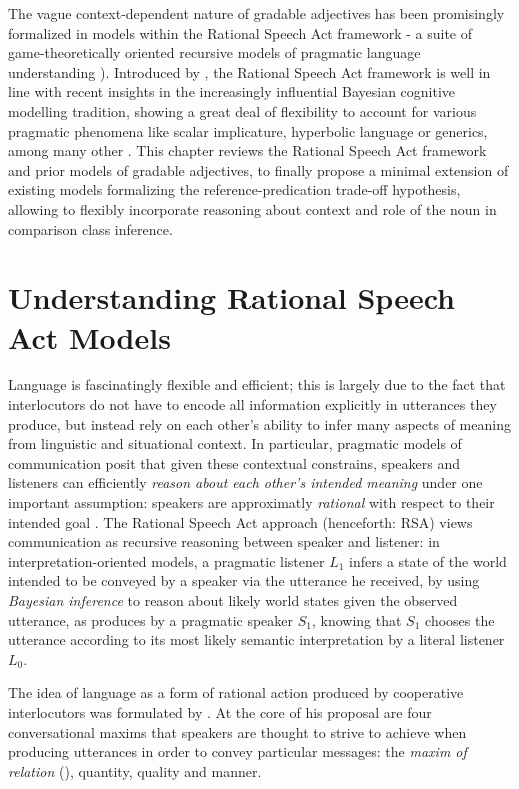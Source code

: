 The vague context-dependent nature of gradable adjectives has been promisingly formalized in models within the Rational Speech Act framework -  a suite of game-theoretically oriented recursive models of pragmatic language understanding \parencite[e.g.,][]{goodman2016, lassiter2017adjectival, tessler2017warm}). Introduced by \textcite{frank2012predicting}, the Rational Speech Act framework is well in line with recent insights in the increasingly influential Bayesian cognitive modelling tradition, showing a great deal of flexibility to account for various pragmatic phenomena like scalar implicature, hyperbolic language or generics, among many other \parencite[e.g.,][]{tenenbaum2011grow, problang}. This chapter reviews the Rational Speech Act framework and prior models of gradable adjectives, to finally propose a minimal extension of existing models formalizing the reference-predication trade-off hypothesis, allowing to flexibly incorporate reasoning about context and role of the noun in comparison class inference. 
  
\section{Understanding Rational Speech Act Models}

Language is fascinatingly flexible and efficient; this is largely due to the fact that interlocutors do not have to encode all information explicitly in utterances they produce, but instead rely on each other's ability to infer many aspects of meaning from linguistic and situational context. In particular, pragmatic models of communication posit that given these contextual constrains, speakers and listeners can efficiently \emph{reason about each other's intended meaning} under one important assumption: speakers are approximatly \emph{rational} with respect to their intended goal \parencite{frank2012predicting}. The Rational Speech Act approach (henceforth: RSA) views communication as recursive reasoning between speaker and listener: in interpretation-oriented models, a pragmatic listener $L_1$ infers a state of the world intended to be conveyed by a speaker via the utterance he received, by using \emph{Bayesian inference} to reason about likely world states given the observed utterance, as produces by a pragmatic speaker $S_1$, knowing that $S_1$ chooses the utterance according to its most likely semantic interpretation by a literal listener $L_0$.  

The idea of language as a form of rational action produced by cooperative interlocutors was formulated by \textcite{grice1975logic}. At the core of his proposal are four conversational maxims that speakers are thought to strive to achieve when producing utterances in order to convey particular messages: the \emph{maxim of relation} (), quantity, quality and manner. 

